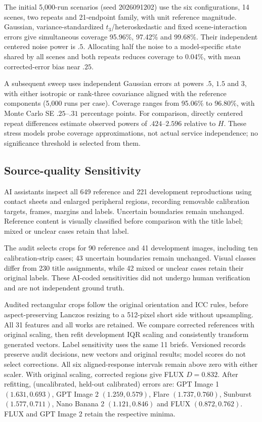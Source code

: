 The initial 5,000-run scenarios (seed 2026091202) use the six configurations,
14 scenes, two repeats and 21-endpoint family, with unit reference magnitude.
Gaussian, variance-standardized $t_3$/heteroskedastic and fixed scene-interaction
errors give simultaneous coverage 95.96\%, 97.42\% and 99.68\%. Their independent
centered noise power is $.5$. Allocating half the noise to a model-specific
state shared by all scenes and both repeats reduces coverage to 0.04\%, with
mean corrected-error bias near $.25$.

A subsequent sweep uses independent Gaussian errors at powers $.5$, $1.5$ and
$3$, with either isotropic or rank-three covariance aligned with the reference
components (5,000 runs per case). Coverage ranges from 95.06\% to 96.80\%, with
Monte Carlo SE $.25$--$.31$ percentage points. For comparison, directly centered
repeat differences estimate observed powers of $.424$--$2.596$ relative to $H$.
These stress models probe coverage approximations, not actual service independence;
no significance threshold is selected from them.

\subsection{Source-quality Sensitivity}\label{app:reference-quality}
AI assistants inspect all 649 reference and 221 development reproductions
using contact sheets and enlarged peripheral regions, recording removable
calibration targets, frames, margins and labels. Uncertain boundaries remain
unchanged. Reference content is visually classified before comparison with the
title label; mixed or unclear cases retain that label.

The audit selects crops for 90 reference and 41 development images, including
ten calibration-strip cases; 43 uncertain boundaries remain unchanged. Visual
classes differ from 230 title assignments, while 42 mixed or unclear cases
retain their original labels. These AI-coded sensitivities did not undergo human verification and are not
independent ground truth.

Audited rectangular crops follow the original orientation and ICC rules, before
aspect-preserving Lanczos resizing to a 512-pixel short side without upsampling.
All 31 features and all works are retained. We compare corrected references with
original scaling, then refit development IQR scaling and consistently transform
generated vectors. Label sensitivity uses the same 11 briefs. Versioned records
preserve audit decisions, new vectors and original results; model scores do not
select corrections.
All six aligned-response intervals remain above zero with either scaler.
With original scaling, corrected regions give FLUX $D=0.832$.
After refitting, (uncalibrated, held-out calibrated) errors are:
GPT Image 1 $(1.631,0.693)$, GPT Image 2 $(1.259,0.579)$,
Flare $(1.737,0.760)$, Sunburst $(1.577,0.711)$, Nano Banana 2 $(1.121,0.846)$
and FLUX $(0.872,0.762)$. FLUX and GPT Image 2 retain the respective minima.

